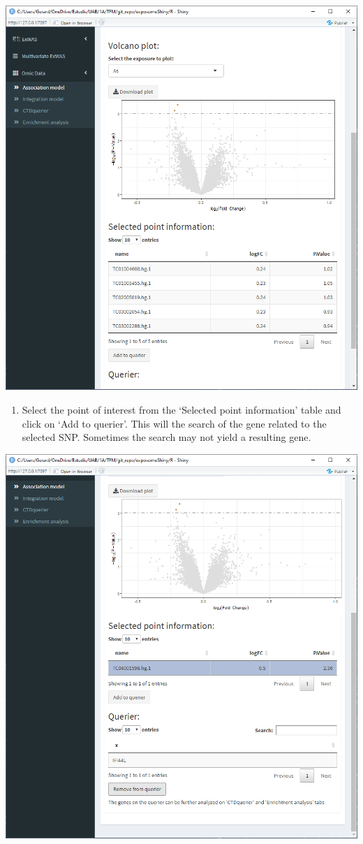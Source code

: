 \documentclass[
]{book}
\providecommand{\tightlist}{%
  \setlength{\itemsep}{0pt}\setlength{\parskip}{0pt}}
\begin{document}
\includegraphics{images/analysis10_2_1.png}

\begin{enumerate}
\def\labelenumi{\arabic{enumi}.}
\setcounter{enumi}{3}
\tightlist
\item
  Select the point of interest from the `Selected point information' table and click on `Add to querier'. This will the search of the gene related to the selected SNP. Sometimes the search may not yield a resulting gene.
\end{enumerate}

\includegraphics{images/analysis10_2_2.png}
\end{document}
